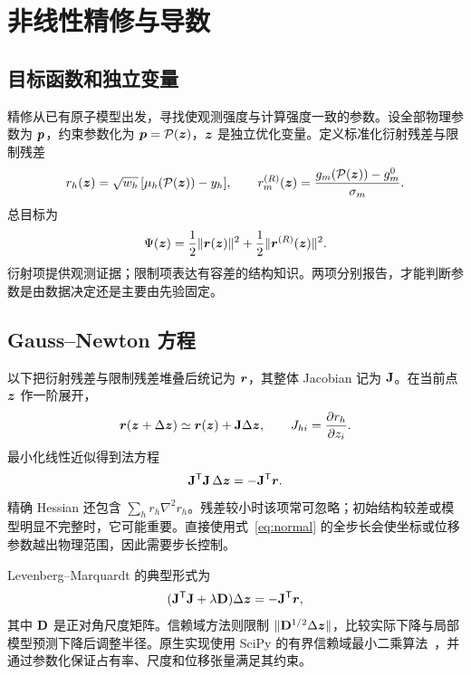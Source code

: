\chapter{非线性精修与导数}
\section{目标函数和独立变量}
精修从已有原子模型出发，寻找使观测强度与计算强度一致的参数。设全部物理参数为 $\bm{p}$，约束参数化为 $\bm{p}=\mathcal P(\bm{z})$，$\bm{z}$ 是独立优化变量。定义标准化衍射残差与限制残差
\begin{equation}
r_h(\bm{z})=\sqrt{w_h}\,[\mu_h(\mathcal P(\bm{z}))-y_h],
\qquad
r^{(R)}_m(\bm{z})=\frac{g_m(\mathcal P(\bm{z}))-g_m^0}{\sigma_m}.
\end{equation}
总目标为
\begin{equation}
\Psi(\bm{z})=\frac12\lVert\bm{r}(\bm{z})\rVert^2
+\frac12\lVert\bm{r}^{(R)}(\bm{z})\rVert^2.
\label{eq:objective}
\end{equation}
衍射项提供观测证据；限制项表达有容差的结构知识。两项分别报告，才能判断参数是由数据决定还是主要由先验固定。

\section{Gauss--Newton 方程}
以下把衍射残差与限制残差堆叠后统记为 $\bm{r}$，其整体 Jacobian 记为 $\mathbf{J}$。在当前点 $\bm{z}$ 作一阶展开，
\begin{equation}
\bm{r}(\bm{z}+\Delta\bm{z})
\simeq\bm{r}(\bm{z})+\mathbf{J}\Delta\bm{z},
\qquad J_{hi}=\frac{\partial r_h}{\partial z_i}.
\end{equation}
最小化线性近似得到法方程
\begin{equation}
\mathbf{J}^{\mathsf T}\mathbf{J}\,\Delta\bm{z}
=-\mathbf{J}^{\mathsf T}\bm{r}.
\label{eq:normal}
\end{equation}
精确 Hessian 还包含 $\sum_h r_h\nabla^2r_h$。残差较小时该项常可忽略；初始结构较差或模型明显不完整时，它可能重要。直接使用式~\eqref{eq:normal} 的全步长会使坐标或位移参数越出物理范围，因此需要步长控制。

Levenberg--Marquardt 的典型形式为
\begin{equation}
(\mathbf{J}^{\mathsf T}\mathbf{J}+\lambda\mathbf{D})\Delta\bm{z}
=-\mathbf{J}^{\mathsf T}\bm{r},
\end{equation}
其中 $\mathbf{D}$ 是正对角尺度矩阵。信赖域方法则限制 $\lVert\mathbf{D}^{1/2}\Delta\bm{z}\rVert$，比较实际下降与局部模型预测下降后调整半径。原生实现使用 SciPy 的有界信赖域最小二乘算法~\cite{scipy_lsq}，并通过参数化保证占有率、尺度和位移张量满足其约束。

